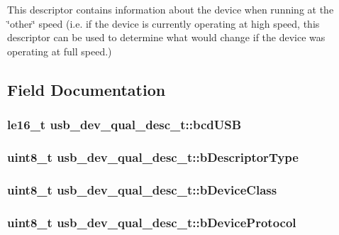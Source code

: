 \-This descriptor contains information about the device when running at the \char`\"{}other\char`\"{} speed (i.\-e. if the device is currently operating at high speed, this descriptor can be used to determine what would change if the device was operating at full speed.) 

\subsection{\-Field \-Documentation}
\hypertarget{structusb__dev__qual__desc__t_aaa85310913481e227da025a8b37c988f}{
\subsubsection[{bcd\-U\-S\-B}]{\setlength{\rightskip}{0pt plus 5cm}le16\-\_\-t {\bf usb\-\_\-dev\-\_\-qual\-\_\-desc\-\_\-t\-::bcd\-U\-S\-B}}}
\label{structusb__dev__qual__desc__t_aaa85310913481e227da025a8b37c988f}
\hypertarget{structusb__dev__qual__desc__t_aed758dffce7cdb50d55d5abc14616e2c}{
\subsubsection[{b\-Descriptor\-Type}]{\setlength{\rightskip}{0pt plus 5cm}uint8\-\_\-t {\bf usb\-\_\-dev\-\_\-qual\-\_\-desc\-\_\-t\-::b\-Descriptor\-Type}}}
\label{structusb__dev__qual__desc__t_aed758dffce7cdb50d55d5abc14616e2c}
\hypertarget{structusb__dev__qual__desc__t_a16fd77f16bb0389ff50102288857604c}{
\subsubsection[{b\-Device\-Class}]{\setlength{\rightskip}{0pt plus 5cm}uint8\-\_\-t {\bf usb\-\_\-dev\-\_\-qual\-\_\-desc\-\_\-t\-::b\-Device\-Class}}}
\label{structusb__dev__qual__desc__t_a16fd77f16bb0389ff50102288857604c}
\hypertarget{structusb__dev__qual__desc__t_ab6fc5f8ccf24352ff0add744af39f175}{
\subsubsection[{b\-Device\-Protocol}]{\setlength{\rightskip}{0pt plus 5cm}uint8\-\_\-t {\bf usb\-\_\-dev\-\_\-qual\-\_\-desc\-\_\-t\-::b\-Device\-Protocol}}}

